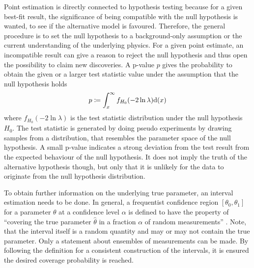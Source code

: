 Point estimation is directly connected to hypothesis testing because for a given best-fit result, the significance of being compatible with the null hypothesis is wanted, to see if the alternative model is favoured.
Therefore, the general procedure is to set the null hypothesis to a background-only assumption or the current understanding of the underlying physics.
For a given point estimate, an incompatible result can give a reason to reject the null hypothesis and thus open the possibility to claim new discoveries.
A p-value $p$ gives the probability to obtain the given or a larger test statistic value under the assumption that the null hypothesis holds
\begin{equation}
  p \coloneqq \int_x^\infty f_{H_0}(-2\ln\lambda) \mathrm{d}(x)
\end{equation}
where $f_{H_0}(-2\ln\lambda)$ is the test statistic distribution under the null hypothesis $H_0$.
The test statistic is generated by doing pseudo experiments by drawing samples from a distribution, that resembles the parameter space of the null hypothesis.
A small p-value indicates a strong deviation from the test result from the expected behaviour of the null hypothesis.
It does not imply the truth of the alternative hypothesis though, but only that it is unlikely for the data to originate from the null hypothesis distribution.

To obtain further information on the underlying true parameter, an interval estimation needs to be done.
In general, a frequentist confidence region $[\theta_0, \theta_1]$ for a parameter $\theta$ at a confidence level $\alpha$ is defined to have the property of \enquote{covering the true parameter $\hat{\theta}$ in a fraction $\alpha$ of random measurements} .
Note, that the interval itself is a random quantity and may or may not contain the true parameter.
Only a statement about ensembles of measurements can be made.
By following the definition for a consistent construction of the intervals, it is ensured the desired coverage probability is reached.


